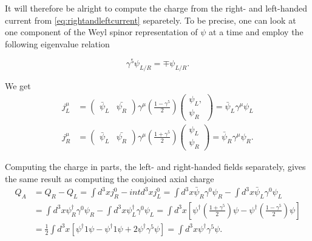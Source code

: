 \documentclass[11pt, a4paper]{amsart}
\begin{document}
It will therefore be alright to compute the charge from the right- and left-handed current from \autoref{eq:rightandleftcurrent} separetely.  To be precise, one can look at one component of the Weyl spinor representation of $\psi$ at a time and employ the following eigenvalue relation

\begin{equation}
\gamma^5 \psi_{L/R} = \mp \psi_{L/R}.
\end{equation}

We get
\begin{align}
j_L^\mu &= \begin{pmatrix}
\bar{\psi}_L & \bar{\psi_R}
\end{pmatrix}\gamma^\mu \left(\frac{1 - \gamma^5}{2}\right) 
\begin{pmatrix}
\psi_L, \\
\psi_R
\end{pmatrix} = \bar{\psi}_L \gamma^\mu \psi_L \\
j_R^\mu &= \begin{pmatrix}
\bar{\psi}_L & \bar{\psi_R}
\end{pmatrix}\gamma^\mu \left(\frac{1 + \gamma^5}{2}\right) 
\begin{pmatrix}
\psi_L \\
\psi_R
\end{pmatrix} = \bar{\psi}_R \gamma^\mu \psi_R.
\end{align}

Computing the charge in parts, the left- and right-handed fields separately, gives the same result as computing the conjoined axial charge
\begin{align*}
Q_A &= Q_R - Q_L = \int d^3x j_R^0 - int d^3x j_L^0 = \int d^3x \bar{\psi}_R\gamma^0\psi_R - \int d^3x \bar{\psi}_L\gamma^0\psi_L \\
	&= \int d^3x \psi^\dagger_R\gamma^0\psi_R - \int d^3x \psi^\dagger_L\gamma^0\psi_L 
	  = \int d^3x \left[\psi^\dagger\left(\frac{1 + \gamma^5}{2} \right) \psi - \psi^\dagger\left(\frac{1 - \gamma^5}{2} \right) \psi  \right] \\
	&= \frac{1}{2} \int d^3x \left[\psi^\dagger 1 \psi - \psi^\dagger 1 \psi + 2\psi^\dagger \gamma^5 \psi \right] 
	   = \int d^3x \psi^\dagger \gamma^5 \psi.
\end{align*}
\end{document}
